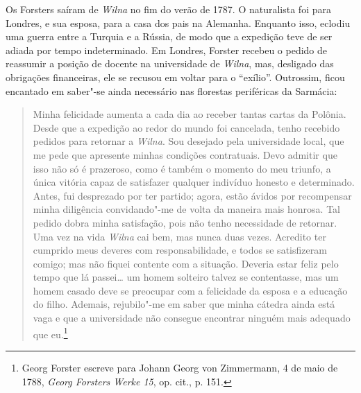 Os Forsters saíram de \textit{Wilna} no fim do verão de 1787. O naturalista foi
para Londres, e sua esposa, para a casa dos pais na Alemanha. Enquanto
isso, eclodiu uma guerra entre a Turquia e a Rússia, de modo que a
expedição teve de ser adiada por tempo indeterminado. Em Londres,
Forster recebeu o pedido de reassumir a posição de docente na
universidade de \textit{Wilna}, mas, desligado das obrigações financeiras, ele se
recusou em voltar para o ``exílio''. Outrossim, ficou encantado em
saber"-se ainda necessário nas florestas periféricas da Sarmácia:

\begin{quote}
Minha felicidade aumenta a cada dia ao receber tantas cartas da Polônia.
Desde que a expedição ao redor do mundo foi cancelada, tenho recebido
pedidos para retornar a \textit{Wilna}. Sou desejado pela universidade local, que
me pede que apresente minhas condições contratuais. Devo admitir que
isso não só é prazeroso, como é também o momento do meu triunfo, a única
vitória capaz de satisfazer qualquer indivíduo honesto e determinado.
Antes, fui desprezado por ter partido; agora, estão ávidos por
recompensar minha diligência convidando"-me de volta da maneira mais
honrosa. Tal pedido dobra minha satisfação, pois não tenho necessidade
de retornar. Uma vez na vida \textit{Wilna} cai bem, mas nunca duas vezes.
Acredito ter cumprido meus deveres com responsabilidade, e todos se
satisfizeram comigo; mas não fiquei contente com a situação. Deveria
estar feliz pelo tempo que lá passei\ldots{} um homem solteiro talvez se
contentasse, mas um homem casado deve se preocupar com a felicidade da
esposa e a educação do filho. Ademais, rejubilo"-me em saber que minha
cátedra ainda está vaga e que a universidade não consegue encontrar
ninguém mais adequado que eu.\footnote{Georg Forster escreve para Johann Georg von Zimmermann, 4 de maio de 1788, \textit{Georg Forsters Werke 15}, op. cit., p. 151.} 
\end{quote}

%

